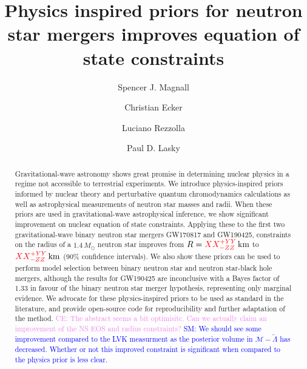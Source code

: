 \documentclass[twocolumn]{aastex631}
\newcommand{\red}[1]{\textcolor{red}{#1}}
\newcommand{\SM}[1]{\textcolor{blue}{SM: #1}}
\newcommand{\CE}[1]{\textcolor{violet}{CE: #1}}
\begin{document}
	
\title{Physics inspired priors for neutron star mergers improves equation of state constraints}

\author[0009-0000-7037-1809]{Spencer J. Magnall}


\author[0000-0002-8669-4300]{Christian Ecker}

\author[0000-0002-1330-7103]{Luciano Rezzolla}


\author[0000-0003-3763-1386]{Paul D. Lasky}
	
\begin{abstract}
 Gravitational-wave astronomy shows great promise in determining nuclear physics in a regime not accessible to terrestrial experiments. 
 We introduce physics-inspired priors informed by nuclear theory and perturbative quantum chromodynamics calculations as well as astrophysical measurements of neutron star masses and radii.
 When these priors are used in gravitational-wave astrophysical inference, we show significant improvement on nuclear equation of state constraints. 
 Applying these to the first two gravitational-wave binary neutron star mergers GW170817 and GW190425, constraints on the radius of a $1.4\,M_\odot$ neutron star improves from $R=\red{XX^{+YY}_{-ZZ}}\,{\rm km}$ to $\red{XX^{+YY}_{-ZZ}}\,{\rm km}$ (90\% confidence intervals).
 We also show these priors can be used to perform model selection between binary neutron star and neutron star-black hole mergers, although the results for GW190425 are inconclusive with a Bayes factor of $1.33$ in favour of the binary neutron star merger hypothesis, representing only marginal evidence.
 We advocate for these physics-inspired priors to be used as standard in the literature, and provide open-source code for reproducibility and further adaptation of the method.
 \CE{The abstract seems a bit optimisitc. Can we actually claim an improvement of the NS EOS and radius constraints?}
\SM{We should see some improvement compared to the LVK measurment as the posterior volume in $\mathcal{M}-\tilde{\Lambda}$ has decreased. Whether or not this improved constraint is significant when compared to the physics prior is less clear.}
\end{abstract}
	
\end{document}
